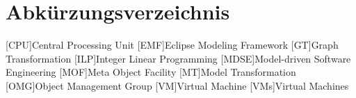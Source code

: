 \section*{Abkürzungsverzeichnis}
\label{sec:list-of-abbreviations}

\begin{acronym}[AAAAAA] %
	[CPU]{Central Processing Unit}
	[EMF]{Eclipse Modeling Framework}
	[GT]{Graph Transformation}
	[ILP]{Integer Linear Programming}
	[MDSE]{Model-driven Software Engineering}
	[MOF]{Meta Object Facility}
	[MT]{Model Transformation}
	[OMG]{Object Management Group}
	[VM]{Virtual Machine}
	[VMs]{Virtual Machines}
\end{acronym}
